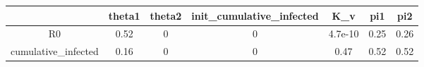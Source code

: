 \begin{tabular}{|c|c|c|c|c|c|c|}
\hline
& theta1 & theta2 & init_cumulative_infected & K_v & pi1 & pi2 \\
\hline
R0 & 0.52 & 0 & 0 & 4.7e-10 & 0.25 & 0.26 \\
\hline
cumulative_infected & 0.16 & 0 & 0 & 0.47 & 0.52 & 0.52 \\
\hline
\end{tabular}
